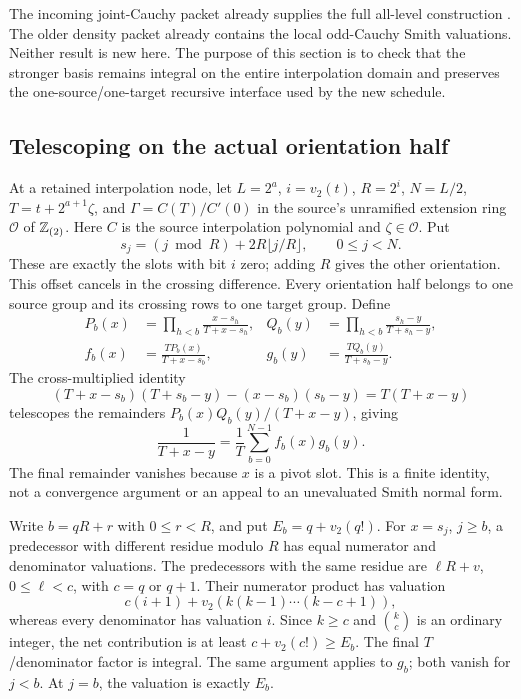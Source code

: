 The incoming joint-Cauchy packet already supplies the full all-level construction \cite{joint}. The older density packet already contains the local odd-Cauchy Smith valuations. Neither result is new here. The purpose of this section is to check that the stronger basis remains integral on the entire interpolation domain and preserves the one-source/one-target recursive interface used by the new schedule.

\subsection{Telescoping on the actual orientation half}
At a retained interpolation node, let $L=2^a$, $i=v_2(t)$, $R=2^i$, $N=L/2$, $T=t+2^{a+1}\zeta$, and $\Gamma=C(T)/C'(0)$ in the source's unramified extension ring $\mathcal O$ of $\mathbb Z_{(2)}$. Here $C$ is the source interpolation polynomial and $\zeta\in\mathcal O$. Put
\[
 s_j=(j\bmod R)+2R\lfloor j/R\rfloor,\qquad 0\le j<N.
\]
These are exactly the slots with bit $i$ zero; adding $R$ gives the other orientation. This offset cancels in the crossing difference. Every orientation half belongs to one source group and its crossing rows to one target group. Define
\begin{align*}
 P_b(x)&=\prod_{h<b}\frac{x-s_h}{T+x-s_h},&
 Q_b(y)&=\prod_{h<b}\frac{s_h-y}{T+s_h-y},\\
 f_b(x)&=\frac{TP_b(x)}{T+x-s_b},&
 g_b(y)&=\frac{TQ_b(y)}{T+s_b-y}.
\end{align*}
The cross-multiplied identity
\[
 (T+x-s_b)(T+s_b-y)-(x-s_b)(s_b-y)=T(T+x-y)
\]
telescopes the remainders $P_b(x)Q_b(y)/(T+x-y)$, giving
\begin{equation}\label{eq:telescoping}
 \frac1{T+x-y}=\frac1T\sum_{b=0}^{N-1}f_b(x)g_b(y).
\end{equation}
The final remainder vanishes because $x$ is a pivot slot. This is a finite identity, not a convergence argument or an appeal to an unevaluated Smith normal form.

Write $b=qR+r$ with $0\le r<R$, and put $E_b=q+v_2(q!)$. For $x=s_j$, $j\ge b$, a predecessor with different residue modulo $R$ has equal numerator and denominator valuations. The predecessors with the same residue are $\ell R+v$, $0\le\ell<c$, with $c=q$ or $q+1$. Their numerator product has valuation
\[
 c(i+1)+v_2(k(k-1)\cdots(k-c+1)),
\]
whereas every denominator has valuation $i$. Since $k\ge c$ and $\binom{k}{c}$ is an ordinary integer, the net contribution is at least $c+v_2(c!)\ge E_b$. The final $T$/denominator factor is integral. The same argument applies to $g_b$; both vanish for $j<b$. At $j=b$, the valuation is exactly $E_b$.

